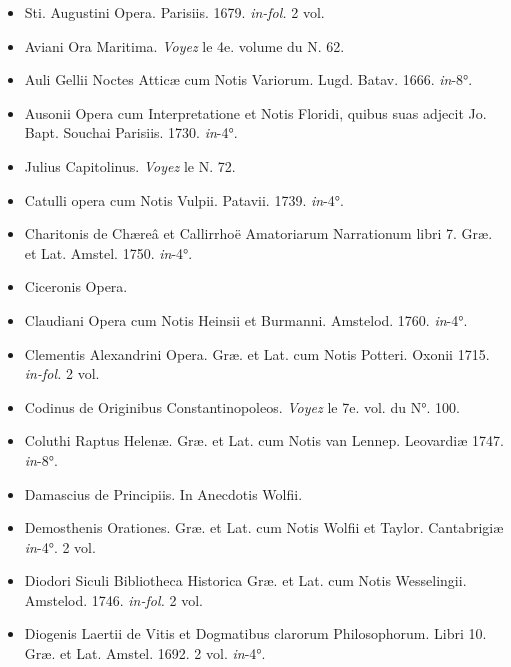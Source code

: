 \documentclass[a4paper, 11pt, oneside, polutonikogreek, french]{article}
\begin{document}
\begin{itemize}
    \item Sti. Augustini Opera. Parisiis. 1679. \emph{in-fol.} 2 vol.

    \item Aviani Ora Maritima. \emph{Voyez} le 4e. volume du N. 62.

    \item Auli Gellii Noctes Atticæ cum Notis Variorum. Lugd. Batav. 1666. \emph{in}-8°.

    \item Ausonii Opera cum Interpretatione et Notis Floridi, quibus suas adjecit Jo. Bapt. Souchai Parisiis. 1730. \emph{in}-4°.

    \item Julius Capitolinus. \emph{Voyez} le N. 72.

    \item Catulli opera cum Notis Vulpii. Patavii. 1739. \emph{in}-4°.

    \item Charitonis de Chæreâ et Callirrhoë Amatoriarum Narrationum libri 7. Græ. et Lat. Amstel. 1750. \emph{in}-4°.

    \item Ciceronis Opera.

    \item Claudiani Opera cum Notis Heinsii et Burmanni. Amstelod. 1760. \emph{in}-4°.

    \item Clementis Alexandrini Opera. Græ. et Lat. cum Notis Potteri. Oxonii 1715. \emph{in-fol.} 2 vol.

    \item Codinus de Originibus Constantinopoleos. \emph{Voyez} le 7e. vol. du N°. 100.

    \item Coluthi Raptus Helenæ. Græ. et Lat. cum Notis van Lennep. Leovardiæ 1747. \emph{in}-8°.

    \item Damascius de Principiis. In Anecdotis Wolfii.

    \item Demosthenis Orationes. Græ. et Lat. cum Notis Wolfii et Taylor. Cantabrigiæ \emph{in}-4°. 2 vol.

    \item Diodori Siculi Bibliotheca Historica Græ. et Lat. cum Notis Wesselingii. Amstelod. 1746. \emph{in-fol.} 2 vol.

    \item Diogenis Laertii de Vitis et Dogmatibus clarorum Philosophorum. Libri 10. Græ. et Lat. Amstel. 1692. 2 vol. \emph{in}-4°.


\end{itemize}
\end{document}
